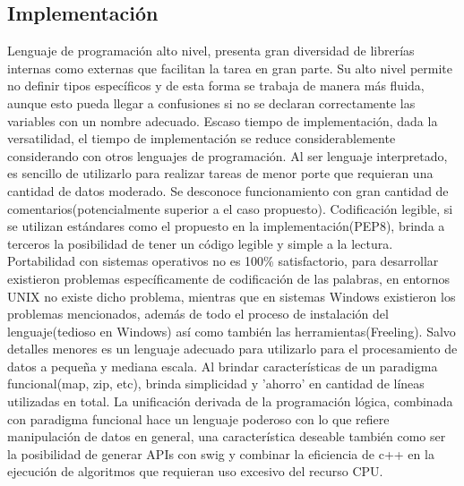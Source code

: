 \documentclass[12pt]{article}
\begin{document}
\subsection{Implementación}
Lenguaje de programación alto nivel, presenta gran diversidad de librerías internas como externas que facilitan la tarea en gran parte. Su alto nivel permite no definir tipos específicos y de esta forma se trabaja de manera más fluida, aunque esto pueda llegar a confusiones si no se declaran correctamente las variables con un nombre adecuado.
Escaso tiempo de implementación, dada la versatilidad, el tiempo de implementación se reduce considerablemente considerando con otros lenguajes de programación.
Al ser lenguaje interpretado, es sencillo de utilizarlo para realizar tareas de menor porte que requieran una cantidad de datos moderado. Se desconoce funcionamiento con gran cantidad de comentarios(potencialmente superior a el caso propuesto).
Codificación legible, si se utilizan estándares como el propuesto en la implementación(PEP8), brinda a terceros la posibilidad de tener un código legible y simple a la lectura.
Portabilidad con sistemas operativos no es 100\% satisfactorio, para desarrollar existieron problemas específicamente de codificación de las palabras, en entornos UNIX no existe dicho problema, mientras que en sistemas Windows existieron los problemas mencionados, además de todo el proceso de instalación del lenguaje(tedioso en Windows) así como también las herramientas(Freeling).
Salvo detalles menores es un lenguaje adecuado para utilizarlo para el procesamiento de datos a pequeña y mediana escala.
Al brindar características de un paradigma funcional(map, zip, etc), brinda simplicidad y 'ahorro' en cantidad de líneas utilizadas en total.
La unificación derivada de la programación lógica, combinada con paradigma funcional hace un lenguaje poderoso con lo que refiere manipulación de datos en general, una característica deseable también como  ser la posibilidad de generar APIs con swig y combinar la eficiencia de c++ en la ejecución de algoritmos que requieran uso excesivo del recurso CPU. 
\end{document}
